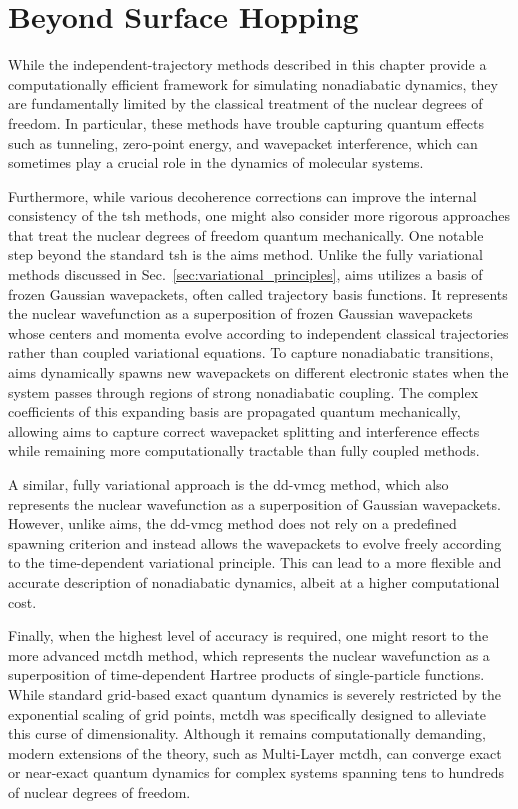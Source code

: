\section{Beyond Surface Hopping}\label{sec:beyond_surface_hopping}
While the independent-trajectory methods described in this chapter provide a computationally efficient framework for simulating nonadiabatic dynamics, they are fundamentally limited by the classical treatment of the nuclear degrees of freedom. In particular, these methods have trouble capturing quantum effects such as tunneling, zero-point energy, and wavepacket interference, which can sometimes play a crucial role in the dynamics of molecular systems.

Furthermore, while various decoherence corrections can improve the internal consistency of the \gls{tsh} methods, one might also consider more rigorous approaches that treat the nuclear degrees of freedom quantum mechanically. One notable step beyond the standard \gls{tsh} is the \gls{aims} method.\supercite{10.1021/jp994174i} Unlike the fully variational methods discussed in Sec.~\ref{sec:variational_principles}, \gls{aims} utilizes a basis of frozen Gaussian wavepackets, often called trajectory basis functions. It represents the nuclear wavefunction as a superposition of frozen Gaussian wavepackets whose centers and momenta evolve according to independent classical trajectories rather than coupled variational equations. To capture nonadiabatic transitions, \gls{aims} dynamically spawns new wavepackets on different electronic states when the system passes through regions of strong nonadiabatic coupling. The complex coefficients of this expanding basis are propagated quantum mechanically, allowing \gls{aims} to capture correct wavepacket splitting and interference effects while remaining more computationally tractable than fully coupled methods.

A similar, fully variational approach is the \gls{dd-vmcg} method, which also represents the nuclear wavefunction as a superposition of Gaussian wavepackets.\supercite{10.1039/C8FD00090E} However, unlike \gls{aims}, the \gls{dd-vmcg} method does not rely on a predefined spawning criterion and instead allows the wavepackets to evolve freely according to the time-dependent variational principle. This can lead to a more flexible and accurate description of nonadiabatic dynamics, albeit at a higher computational cost.

Finally, when the highest level of accuracy is required, one might resort to the more advanced \gls{mctdh} method, which represents the nuclear wavefunction as a superposition of time-dependent Hartree products of single-particle functions.\supercite{10.1063/1.472616} While standard grid-based exact quantum dynamics is severely restricted by the exponential scaling of grid points, \gls{mctdh} was specifically designed to alleviate this curse of dimensionality. Although it remains computationally demanding, modern extensions of the theory, such as Multi-Layer \gls{mctdh}, can converge exact or near-exact quantum dynamics for complex systems spanning tens to hundreds of nuclear degrees of freedom.

